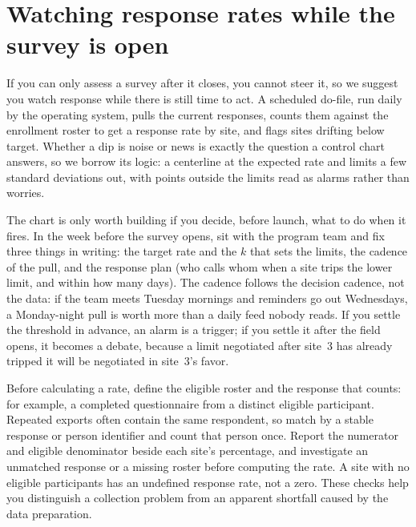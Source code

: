 \section{Watching response rates while the survey is open}\label{sec:monitor}
If you can only assess a survey after it closes, you cannot steer it, so we suggest you watch response while there is still time to act. A scheduled do-file, run daily by the operating system, pulls the current responses, counts them against the enrollment roster to get a response rate by site, and flags sites drifting below target. Whether a dip is noise or news is exactly the question a control chart answers, so we borrow its logic: a centerline at the expected rate and limits a few standard deviations out, with points outside the limits read as alarms rather than worries.

The chart is only worth building if you decide, before launch, what to do when it fires. In the week before the survey opens, sit with the program team and fix three things in writing: the target rate and the $k$ that sets the limits, the cadence of the pull, and the response plan (who calls whom when a site trips the lower limit, and within how many days). The cadence follows the decision cadence, not the data: if the team meets Tuesday mornings and reminders go out Wednesdays, a Monday-night pull is worth more than a daily feed nobody reads. If you settle the threshold in advance, an alarm is a trigger; if you settle it after the field opens, it becomes a debate, because a limit negotiated after site~3 has already tripped it will be negotiated in site~3's favor.

Before calculating a rate, define the eligible roster and the response that counts: for example, a completed questionnaire from a distinct eligible participant. Repeated exports often contain the same respondent, so match by a stable response or person identifier and count that person once. Report the numerator and eligible denominator beside each site's percentage, and investigate an unmatched response or a missing roster before computing the rate. A site with no eligible participants has an undefined response rate, not a zero. These checks help you distinguish a collection problem from an apparent shortfall caused by the data preparation.


